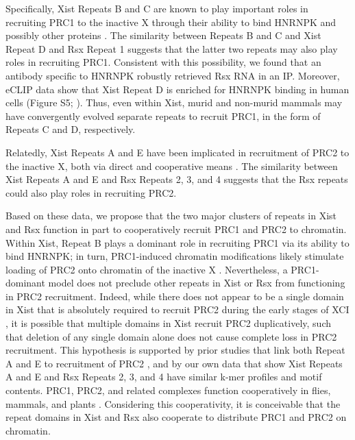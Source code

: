 Specifically, Xist Repeats B and C are known to play important roles in recruiting PRC1 to the inactive X through their ability to bind HNRNPK and possibly other proteins \cite{Pintacuda2017HnRNPKSilencing}. The similarity between Repeats B and C and Xist Repeat D and Rsx Repeat 1 suggests that the latter two repeats may also play roles in recruiting PRC1. Consistent with this possibility, we found that an antibody specific to HNRNPK robustly retrieved Rsx RNA in an IP. Moreover, eCLIP data show that Xist Repeat D is enriched for HNRNPK binding in human cells (Figure S5; \cite{VanNostrand2016RobusteCLIP}). Thus, even within Xist, murid and non-murid mammals may have convergently evolved separate repeats to recruit PRC1, in the form of Repeats C and D, respectively.

Relatedly, Xist Repeats A and E have been implicated in recruitment of PRC2 to the inactive X, both via direct and cooperative means \cite{Almeida2017PCGF3/5-PRC1Inactivation,Cifuentes-Rojas2014Regulatory2,Davidovich2015TowardRNA,Kohlmaier2004AInactivation,Ridings-Figueroa2017TheTerritory,Sunwoo2017RepeatCIZ1,Wang2017TargetingGuanines,Zhao2008PolycombChromosome}. The similarity between Xist Repeats A and E and Rsx Repeats 2, 3, and 4 suggests that the Rsx repeats could also play roles in recruiting PRC2. 

Based on these data, we propose that the two major clusters of repeats in Xist and Rsx function in part to cooperatively recruit PRC1 and PRC2 to chromatin. Within Xist, Repeat B plays a dominant role in recruiting PRC1 via its ability to bind HNRNPK; in turn, PRC1-induced chromatin modifications likely stimulate loading of PRC2 onto chromatin of the inactive X \cite{Almeida2017PCGF3/5-PRC1Inactivation,Pintacuda2017HnRNPKSilencing}. Nevertheless, a PRC1-dominant model does not preclude other repeats in Xist or Rsx from functioning in PRC2 recruitment. Indeed, while there does not appear to be a single domain in Xist that is absolutely required to recruit PRC2 during the early stages of XCI \cite{Kohlmaier2004AInactivation,Wutz2002ChromosomalRNA}, it is possible that multiple domains in Xist recruit PRC2 duplicatively, such that deletion of any single domain alone does not cause complete loss in PRC2 recruitment. This hypothesis is supported by prior studies that link both Repeat A and E to recruitment of PRC2 \cite{Almeida2017PCGF3/5-PRC1Inactivation,Cifuentes-Rojas2014Regulatory2,Davidovich2015TowardRNA,Kohlmaier2004AInactivation,Ridings-Figueroa2017TheTerritory,Sunwoo2017RepeatCIZ1,Wang2017TargetingGuanines,Zhao2008PolycombChromosome}, and by our own data that show Xist Repeats A and E and Rsx Repeats 2, 3, and 4 have similar k-mer profiles and motif contents. PRC1, PRC2, and related complexes function cooperatively in flies, mammals, and plants \cite{Blackledge2015TargetingStory,Li2018Polycomb-mediatedPlants,Schuettengruber2014CooperativityDrosophila}. Considering this cooperativity, it is conceivable that the repeat domains in Xist and Rsx also cooperate to distribute PRC1 and PRC2 on chromatin.

